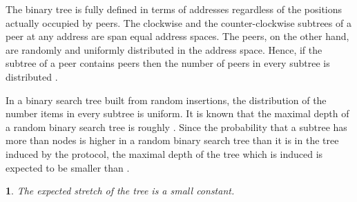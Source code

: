 \documentclass[12pt,english,journal]{elsarticle}
\makeatletter
\numberwithin{equation}{section}
\numberwithin{figure}{section}
\theoremstyle{plain}
\theoremstyle{plain}
\newtheorem{lem}[thm]{\protect\lemmaname}
\newenvironment{proof}[1][\protect\proofname]{\par
\normalfont\topsep6\p@\@plus6\p@\relax
\trivlist
\itemindent\parindent
\item[\hskip\labelsep
\scshape
#1]\ignorespaces
}{\endtrivlist\@endpefalse
}
\providecommand{\proofname}{Proof}
\providecommand{\lemmaname}{Lemma}
\makeatother
\begin{document}
\begin{proof}
The binary tree is fully defined in terms of addresses regardless
of the positions actually occupied by peers. The clockwise and the
counter-clockwise subtrees of a peer at any address are span equal
address spaces. The peers, on the other hand, are randomly and uniformly
distributed in the address space. Hence, if the subtree of a peer
contains  peers then the number of peers in every subtree is distributed
. 

In a binary search tree built from random insertions, the distribution
of the number items in every subtree is uniform. It is known that
the maximal depth of a random binary search tree is roughly .
Since the probability that a subtree has more than 
nodes is higher in a random binary search tree than it is in the tree
induced by the protocol, the maximal depth of the tree which is induced
is expected to be smaller than .\end{proof}
\begin{lem}
The expected stretch of the tree is a small constant.\end{lem}
\end{document}
